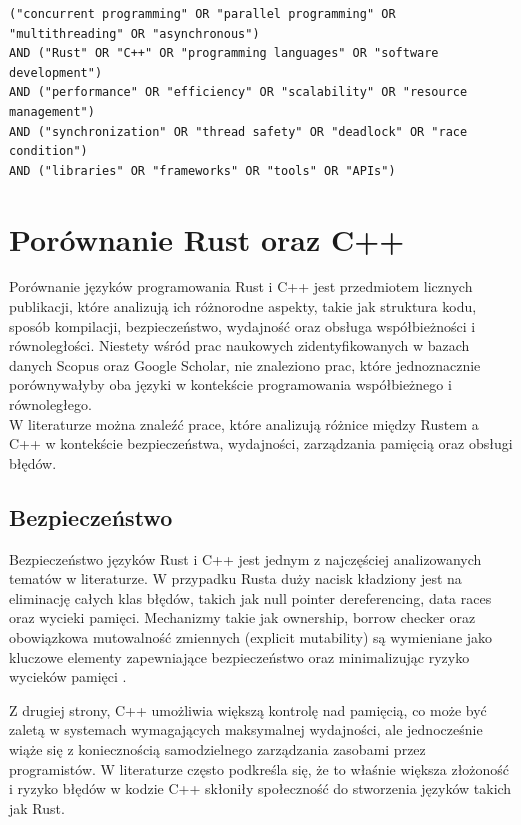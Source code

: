 \lstset{breaklines=true}
\begin{lstlisting}[caption=Kwerenda wygenerowana przez AI, label=AIQuery]
("concurrent programming" OR "parallel programming" OR "multithreading" OR "asynchronous")
AND ("Rust" OR "C++" OR "programming languages" OR "software development")
AND ("performance" OR "efficiency" OR "scalability" OR "resource management")
AND ("synchronization" OR "thread safety" OR "deadlock" OR "race condition")
AND ("libraries" OR "frameworks" OR "tools" OR "APIs")
\end{lstlisting}


\section{Porównanie Rust oraz C++}
Porównanie języków programowania Rust i C++ jest przedmiotem licznych publikacji, które analizują ich różnorodne aspekty, takie jak struktura kodu, sposób kompilacji, bezpieczeństwo, wydajność oraz obsługa współbieżności i równoległości. Niestety wśród prac naukowych zidentyfikowanych w bazach danych Scopus oraz Google Scholar, nie znaleziono prac, które jednoznacznie porównywałyby oba języki w kontekście programowania współbieżnego i równoległego.\\
W literaturze można znaleźć prace, które analizują różnice między Rustem a C++ w kontekście bezpieczeństwa, wydajności, zarządzania pamięcią oraz obsługi błędów.

\subsection{Bezpieczeństwo}
\label{Bezpieczeństwo}
Bezpieczeństwo języków Rust i C++ jest jednym z najczęściej analizowanych tematów w literaturze. W przypadku Rusta duży nacisk kładziony jest na eliminację całych klas błędów, takich jak null pointer dereferencing, data races oraz wycieki pamięci. Mechanizmy takie jak ownership, borrow checker oraz obowiązkowa mutowalność zmiennych (explicit mutability) są wymieniane jako kluczowe elementy zapewniające bezpieczeństwo oraz minimalizując ryzyko wycieków pamięci \cite{MigratingCtoRustforMemorySafety}. 

Z drugiej strony, C++ umożliwia większą kontrolę nad pamięcią, co może być zaletą w systemach wymagających maksymalnej wydajności, ale jednocześnie wiąże się z koniecznością samodzielnego zarządzania zasobami przez programistów. W literaturze \cite{RustDifferences, RustDifferences1} często podkreśla się, że to właśnie większa złożoność i ryzyko błędów w kodzie C++ skłoniły społeczność do stworzenia języków takich jak Rust.

